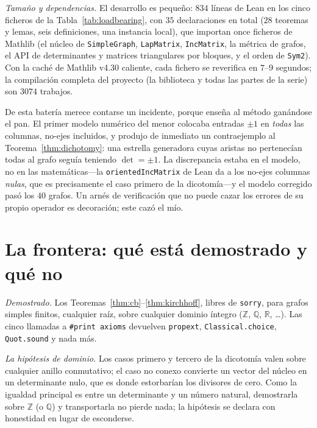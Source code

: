 \documentclass[11pt]{article}
\newcommand{\lean}[1]{\texttt{#1}}
\newcommand{\Z}{\mathbb{Z}}
\newcommand{\R}{\mathbb{R}}
\begin{document}
\emph{Tama\~no y dependencias.} El desarrollo es peque\~no: $834$ l\'ineas de Lean en los
cinco ficheros de la Tabla~\ref{tab:loadbearing}, con $35$ declaraciones en total ($28$
teoremas y lemas, seis definiciones, una instancia local), que importan once ficheros de
Mathlib (el
n\'ucleo de \lean{SimpleGraph}, \lean{LapMatrix}, \lean{IncMatrix}, la m\'etrica de grafos, el
API de determinantes y matrices triangulares por bloques, y el orden de \lean{Sym2}). Con la
cach\'e de Mathlib v4.30 caliente, cada fichero se reverifica en $7$--$9$ segundos; la
compilaci\'on completa del proyecto (la biblioteca y todas las partes de la serie) son $3074$
trabajos.

De esta bater\'ia merece contarse un incidente, porque ense\~na al m\'etodo gan\'andose el pan.
El primer modelo num\'erico del menor colocaba entradas $\pm1$ en \emph{todas} las columnas,
no-ejes incluidos, y produjo de inmediato un contraejemplo al Teorema~\ref{thm:dichotomy}: una
estrella generadora cuyas aristas no pertenec\'ian todas al grafo segu\'ia teniendo
$\det=\pm1$. La discrepancia estaba en el modelo, no en las matem\'aticas---la
\lean{orientedIncMatrix} de Lean da a los no-ejes columnas \emph{nulas}, que es precisamente el
caso primero de la dicotom\'ia---y el modelo corregido pas\'o los $40$ grafos. Un arn\'es de
verificaci\'on que no puede cazar los errores de su propio operador es decoraci\'on; este
caz\'o el m\'io.

\section{La frontera: qu\'e est\'a demostrado y qu\'e no}
\label{sec:boundary}

\emph{Demostrado.} Los Teoremas~\ref{thm:cb}--\ref{thm:kirchhoff}, libres de \lean{sorry}, para
grafos simples finitos, cualquier ra\'iz, sobre cualquier dominio \'integro ($\Z$, $\mathbb Q$,
$\R$, \dots). Las cinco llamadas a \lean{\#print axioms} devuelven \lean{propext},
\lean{Classical.choice}, \lean{Quot.sound} y nada m\'as.

\emph{La hip\'otesis de dominio.} Los casos primero y tercero de la dicotom\'ia valen sobre
cualquier anillo conmutativo; el caso no conexo convierte un vector del n\'ucleo en un
determinante nulo, que es donde estorbar\'ian los divisores de cero. Como la igualdad principal
es entre un determinante y un n\'umero natural, demostrarla sobre $\Z$ (o $\mathbb Q$) y
transportarla no pierde nada; la hip\'otesis se declara con honestidad en lugar de esconderse.
\end{document}
